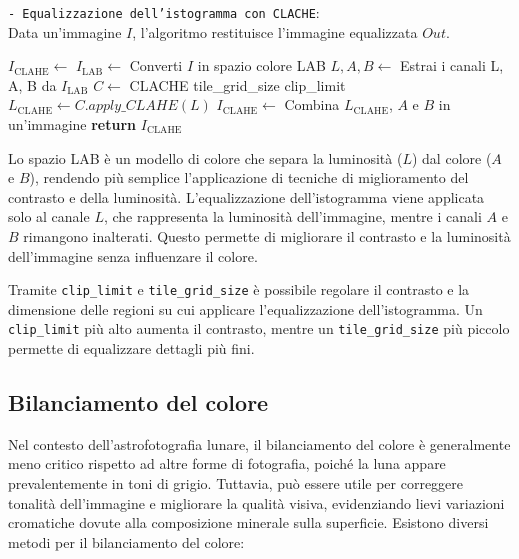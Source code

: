\begin{algorithm}[H]
    \caption{\texttt{- Equalizzazione dell'istogramma con CLACHE}:\\ Data un'immagine $I$, l'algoritmo restituisce l'immagine equalizzata $Out$.} \label{alg:clache}
    \begin{algorithmic}
            \State $I_{\text{CLAHE}} \gets$ 
            \State $I_{\text{LAB}} \gets$ Converti $I$ in spazio colore LAB
            \State $L, A, B \gets$ Estrai i canali L, A, B da $I_{\text{LAB}}$
            \State $C \gets$  CLACHE  tile\_grid\_size  clip\_limit
            \State $L_{\text{CLAHE}} \gets C.apply\_CLAHE(L)$ 
            \State $I_{\text{CLAHE}} \gets$ Combina $L_{\text{CLAHE}}$, $A$ e $B$ in un'immagine
            \State \textbf{return} $I_{\text{CLAHE}}$
        \EndFunction
    \end{algorithmic}
\end{algorithm}

Lo spazio LAB è un modello di colore che separa la luminosità ($L$) dal colore ($A$ e $B$), rendendo più semplice l'applicazione di tecniche di miglioramento del contrasto e della luminosità. L'equalizzazione dell'istogramma viene applicata solo al canale $L$, che rappresenta la luminosità dell'immagine, mentre i canali $A$ e $B$ rimangono inalterati. Questo permette di migliorare il contrasto e la luminosità dell'immagine senza influenzare il colore.

Tramite \texttt{clip\_limit} e \texttt{tile\_grid\_size} è possibile regolare il contrasto e la dimensione delle regioni su cui applicare l'equalizzazione dell'istogramma. Un \texttt{clip\_limit} più alto aumenta il contrasto, mentre un \texttt{tile\_grid\_size} più piccolo permette di equalizzare dettagli più fini.

\subsection{Bilanciamento del colore} \label{subsec:color_balance}

Nel contesto dell'astrofotografia lunare, il bilanciamento del colore è generalmente meno critico rispetto ad altre forme di fotografia, poiché la luna appare prevalentemente in toni di grigio. Tuttavia, può essere utile per correggere tonalità dell'immagine e migliorare la qualità visiva, evidenziando lievi variazioni cromatiche dovute alla composizione minerale sulla superficie. Esistono diversi metodi per il bilanciamento del colore:

